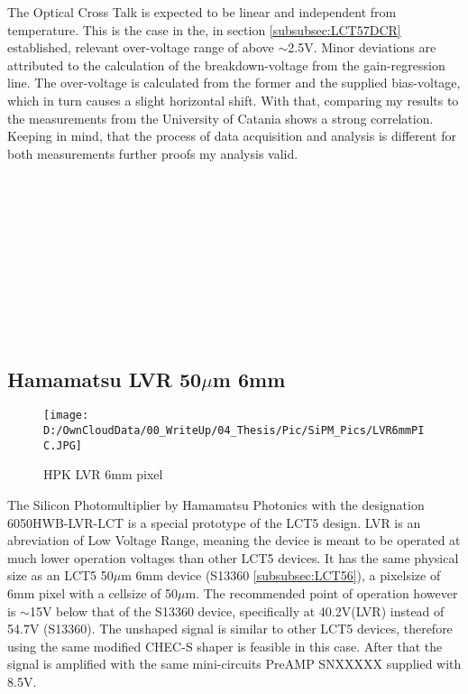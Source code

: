 \documentclass[12pt,article,type=msc,colorback,accentcolor=tud9c]{tudthesis}
\begin{document}
The Optical Cross Talk is expected to be linear and independent from temperature. This is the case in the, in section \ref{subsubsec:LCT57DCR} established, relevant over-voltage range of above $\sim$2.5V. Minor deviations are attributed to the calculation of the breakdown-voltage from the gain-regression line. The over-voltage is calculated from the former and the supplied bias-voltage, which in turn causes a slight horizontal shift. With that, comparing my results to the measurements from the University of Catania shows a strong correlation. Keeping in mind, that the process of data acquisition and analysis is different for both measurements further proofs my analysis valid. 
\\\\\\\\\\\\\\\\\\\\\\



\newpage
\subsection{Hamamatsu LVR 50$\mu$m 6mm}
\begin{wrapfigure}{R}{0.4\textwidth}
\centering
\texttt{[image: D:/OwnCloudData/00\_WriteUp/04\_Thesis/Pic/SiPM\_Pics/LVR6mmPIC.JPG]}
\caption{\label{fig:LVR6_pixel}HPK LVR 6mm pixel}
\end{wrapfigure}

The Silicon Photomultiplier by Hamamatsu Photonics with the designation 6050HWB-LVR-LCT is a special prototype of the LCT5 design. LVR is an abreviation of Low Voltage Range, meaning the device is meant to be operated at much lower operation voltages than other LCT5 devices. It has the same physical size as an LCT5 50$\mu$m 6mm device (S13360 \ref{subsubsec:LCT56}), a pixelsize of 6mm pixel with a cellsize of 50$\mu$m. The recommended point of operation however is $\sim$15V below that of the S13360 device, specifically at 40.2V(LVR) instead of 54.7V (S13360). The unshaped signal is similar to other LCT5 devices, therefore using the same modified CHEC-S shaper is feasible in this case. After that the signal is amplified with the same mini-circuits PreAMP SNXXXXX supplied with 8.5V.
\\
\end{document}
